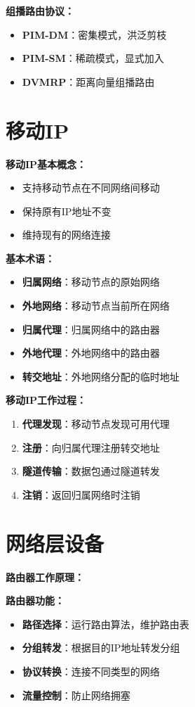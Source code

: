 \documentclass[lang=cn,newtx,10pt,scheme=chinese]{../../elegantbook}
\begin{document}
\textbf{组播路由协议：}
\begin{itemize}
  \item \textbf{PIM-DM}：密集模式，洪泛剪枝
  \item \textbf{PIM-SM}：稀疏模式，显式加入
  \item \textbf{DVMRP}：距离向量组播路由
\end{itemize}

\section{移动IP}

\textbf{移动IP基本概念：}
\begin{itemize}
  \item 支持移动节点在不同网络间移动
  \item 保持原有IP地址不变
  \item 维持现有的网络连接
\end{itemize}

\textbf{基本术语：}
\begin{itemize}
  \item \textbf{归属网络}：移动节点的原始网络
  \item \textbf{外地网络}：移动节点当前所在网络
  \item \textbf{归属代理}：归属网络中的路由器
  \item \textbf{外地代理}：外地网络中的路由器
  \item \textbf{转交地址}：外地网络分配的临时地址
\end{itemize}

\textbf{移动IP工作过程：}
\begin{enumerate}
  \item \textbf{代理发现}：移动节点发现可用代理
  \item \textbf{注册}：向归属代理注册转交地址
  \item \textbf{隧道传输}：数据包通过隧道转发
  \item \textbf{注销}：返回归属网络时注销
\end{enumerate}

\section{网络层设备}

\textbf{路由器工作原理：}

\textbf{路由器功能：}
\begin{itemize}
  \item \textbf{路径选择}：运行路由算法，维护路由表
  \item \textbf{分组转发}：根据目的IP地址转发分组
  \item \textbf{协议转换}：连接不同类型的网络
  \item \textbf{流量控制}：防止网络拥塞
\end{itemize}
\end{document}
